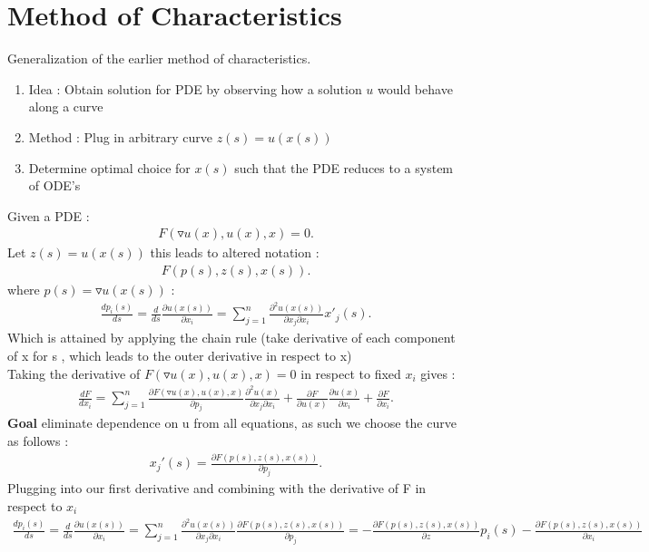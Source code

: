 \section{Method of Characteristics}
Generalization of the earlier method of characteristics. 
\begin{enumerate}
  \item Idea : Obtain solution for PDE by observing how a solution $u$ would behave along a curve 
  \item Method : Plug in arbitrary curve $z(s) = u(x(s))$
  \item Determine optimal choice for $x(s)$ such that the PDE reduces to a system of ODE's
\end{enumerate}
\begin{example}
 Given a PDE : 
 \begin{align*}
  F(\triangledown u(x),u(x),x) = 0
 .\end{align*}
 Let $z(s) = u(x(s))$ this leads to altered notation : 
 \begin{align*}
  F(p(s),z(s),x(s))
 .\end{align*}
 where $p(s) = \triangledown u(x(s))$ : 
 \begin{align*}
  \frac{dp_i(s)}{ds} = \frac{d}{ds} \frac{\partial u(x(s))}{\partial x_i}= \sum_{j=1}^{n}\frac{\partial^2 u(x(s))}{\partial x_j \partial x_i} x'_j(s)   
 .\end{align*}
 Which is attained by applying the chain rule (take derivative of each component of x for s , which leads to the outer derivative in respect to x)\\ 
 Taking the derivative of $F(\triangledown u(x),u(x),x)=0$ in respect to fixed $x_{i}$ gives : 
 \begin{align*}
   \frac{d F}{d x_i} = \sum_{j=1}^n \frac{\partial F(\triangledown u(x),u(x),x)}{\partial p_j} \frac{\partial^2 u(x)}{\partial x_j \partial x_i}+ \frac{\partial F}{\partial u(x)}  \frac{\partial u(x)}{\partial x_i} + \frac{\partial F}{\partial x_i}
 .\end{align*}
 \textbf{Goal} eliminate dependence on u from all equations, as such we choose the curve as follows : 
 \begin{align*}
  x_j'(s) = \frac{\partial F(p(s),z(s),x(s))}{\partial p_j} 
 .\end{align*}
 Plugging into our first derivative and combining with the derivative of F in respect to $x_{i}$
  \begin{align*}
    \frac{dp_i(s)}{ds} = \frac{d}{ds} \frac{\partial u(x(s))}{\partial x_i}= \sum_{j=1}^{n}\frac{\partial^2 u(x(s))}{\partial x_j \partial x_i} \frac{\partial F(p(s),z(s),x(s))}{\partial p_j}    =  - \frac{\partial F(p(s),z(s),x(s))}{\partial z} p_{i}(s) -\frac{\partial F(p(s),z(s),x(s))}{\partial x_i}  

\end{align*}
\end{example}
